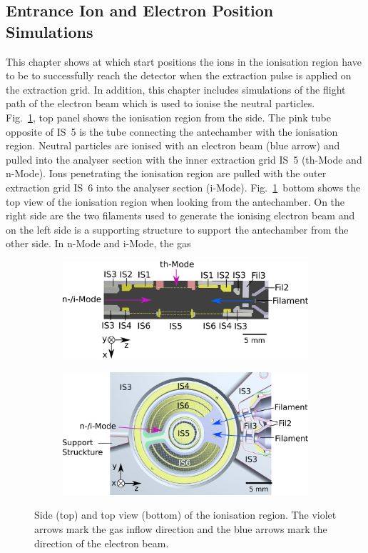 	\subsection{Entrance Ion and Electron Position Simulations}
	This chapter shows at which start positions the ions in the ionisation region have to be to successfully reach the detector when the extraction pulse is applied on the extraction grid. In addition, this chapter includes simulations of the flight path of the electron beam which is used to ionise the neutral particles.\\
	Fig.~\ref{fig:PFMentrSideTopSchemas}, top panel shows the ionisation region from the side. The pink tube opposite of IS~5 is the tube connecting the antechamber with the ionisation region. Neutral particles are ionised with an electron beam (blue arrow) and pulled into the analyser section with the inner extraction grid IS~5 (th-Mode and n-Mode). Ions penetrating the ionisation region are pulled with the outer extraction grid IS~6 into the analyser section (i-Mode). Fig.~\ref{fig:PFMentrSideTopSchemas}~bottom shows the top view of the ionisation region when looking from the antechamber. On the right side are the two filaments used to generate the ionising electron beam and on the left side is a supporting structure to support the antechamber from the other side. In n-Mode and i-Mode, the gas 
	\begin{figure}[h] %
		\begin{subfigure}[t]{\textwidth}
			\centering
			\includegraphics[width=.8\textwidth]{Experiments/PFMEntrance_Side_Schema.png}
		\end{subfigure}
		\par\bigskip
		\begin{subfigure}[b]{\textwidth}
			\centering
			\includegraphics[width=.85\textwidth]{Experiments/PFMEntrance_Top_Schema.png}
		\end{subfigure}
		\caption{Side (top) and top view (bottom) of the ionisation region. The violet arrows mark the gas inflow direction and the blue arrows mark the direction of the electron beam.}
		\label{fig:PFMentrSideTopSchemas}
	\end{figure}
